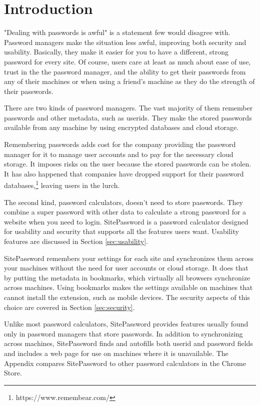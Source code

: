 \section{Introduction}\label{intro}

"Dealing with passwords is awful" is a statement few would disagree with.  Password managers make the situation less awful, improving both security and usability.  Basically, they make it easier for you to have a different, strong password for every site.  Of course, users care at least as much about ease of use, trust in the the password manager, and the ability to get their passwords from any of their machines or when using a friend's machine as they do the strength of their passwords.

There are two kinds of password managers.  The vast majority of them remember passwords and other metadata, such as userids.   They  make the stored passwords available from any machine by using  encrypted databases and cloud storage.

Remembering passwords adds cost for the company providing the password manager for it to manage user accounts and to pay for the necessary cloud storage.  It imposes risks on the user because the stored passwords can be stolen.  It has also happened that companies have dropped support for their password databases,\footnote{https://www.remembear.com/} leaving users in the lurch.

The second kind, password calculators, doesn't need to store passwords.  They combine a super password with other data to calculate a strong password for a website when you need to login.  SitePassword is a password calculator designed for usability and security that supports all the features users want.  Usability features are discussed in Section \ref{sec:usability}.

SitePassword remembers your settings for each site and synchronizes them across your machines without the need for user accounts or cloud storage.  It does that by putting the metadata in bookmarks, which virtually all browsers synchronize across machines.  Using bookmarks makes the settings available on machines that cannot install the extension, such as mobile devices. The security aspects of this choice are covered in Section \ref{sec:security}.

Unlike most password calculators, SitePassword provides features usually found only in password managers that store passwords.  In addition to synchronizing across machines, SitePassword finds and autofills both userid and password fields and includes a web page for use on machines where it is unavailable.  The Appendix compares SitePassword to other password calculators in the Chrome Store.

